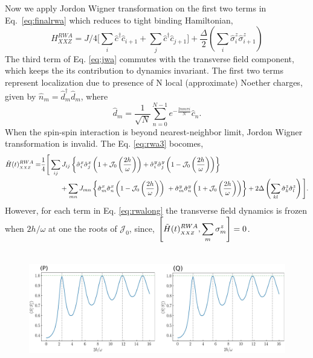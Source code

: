 \documentclass[aps,prb,reprint,showpacs,floatfix,superscriptaddress, onecolumn, nofootinbib, 9pt]{revtex4-2}
\begin{document}
\begin{enumerate}
{\begin{equation}
	\label{eq:finalrwa}
\end{equation}
Now we apply Jordon Wigner transformation on the first two terms in Eq.~\eqref{eq:finalrwa} which reduces to tight binding Hamiltonian, 
\begin{equation}
	H^{RWA}_{XXZ} = J/4\big[ \sum_i\hat{c}^\dagger\hat{c}_{i+1}  + \sum_j\hat{c}^\dagger\hat{c}_{j+1}\big] + \frac{\Delta}{2}\left(\sum_{i}  \hat{\sigma}_{i}^{z} \hat{\sigma}_{i+1}^{z}\right)
	\label{eq:jwa}
\end{equation}
The third term of Eq. \eqref{eq:jwa} commutes with the transverse field component, which keeps the its contribution to dynamics invariant. The first two terms represent localization due to presence of N local (approximate) Noether charges, given by $\hat{n}_m= \hat{d}^{\dagger}_m\hat{d}^{\;}_m$, where
\begin{equation}
\hat{d}_m = \frac{1}{\sqrt{N}}\sum_{n=0}^{N-1}e^{-\frac{2nm\pi i}{N}}\hat{c}_n.
\end{equation}
When the spin-spin interaction is beyond nearest-neighbor limit, Jordon Wigner transformation is invalid. The Eq. \eqref{eq:rwa3} bocomes,
\begin{align}
	\tilde{H}(t)^{RWA}_{_{XXZ}}= & \frac14\Bigg[\sum_{ij} J_{ij}\left\{ \hat{\sigma}^x_i \hat{\sigma}^x_{j}\left(1+ \mathcal{J}_0\left(\frac{2h}{\omega}\right)\right) + \hat{\sigma}^y_i \hat{\sigma}^y_{j} \left(1- \mathcal{J}_0\left(\frac{2h}{\omega}\right)\right)\right\}\nonumber\\
	& \hskip1cm + \sum_{mn} J_{mn}\left\{ \hat{\sigma}^x_m \hat{\sigma}^x_{n}\left(1- \mathcal{J}_0\left(\frac{2h}{\omega}\right)\right)\ + \hat{\sigma}^y_m \hat{\sigma}^y_{n} \left(1+ \mathcal{J}_0\left(\frac{2h}{\omega}\right)\right)\right\}+ 2\Delta \left(\sum_{kl}  \hat{\sigma}_{k}^{z} \hat{\sigma}_{l}^{z}\right)\Bigg].
	\label{eq:rwalong}
\end{align}
However, for each term in Eq. \eqref{eq:rwalong} the transverse field dynamics is frozen when $2h/\omega$ at one the roots of $\mathcal{J}_0$, since, $\displaystyle \comm{\tilde{H}(t)^{RWA}_{_{XXZ}}}{\displaystyle\sum_m\sigma^z_m}=0$. 
\begin{figure}[t]
	\includegraphics[height=5cm]{xxz_d.png}

\end{figure}}
\end{enumerate}
\end{document}
